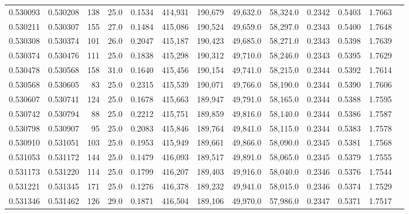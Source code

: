 \begin{tabular}{rrrrrrrrrrrrr}
0.530093 & 0.530208 &   138 & 25.0 &                                     0.1534 & 414,931 & 190,679 &  49,632.0 &  58,324.0 & 0.2342 & 0.5403 & 1.7663 \\
0.530211 & 0.530307 &   155 & 27.0 &                                     0.1484 & 415,086 & 190,524 &  49,659.0 &  58,297.0 & 0.2343 & 0.5400 & 1.7648 \\
0.530308 & 0.530374 &   101 & 26.0 &                                     0.2047 & 415,187 & 190,423 &  49,685.0 &  58,271.0 & 0.2343 & 0.5398 & 1.7639 \\
0.530374 & 0.530476 &   111 & 25.0 &                                     0.1838 & 415,298 & 190,312 &  49,710.0 &  58,246.0 & 0.2343 & 0.5395 & 1.7629 \\
0.530478 & 0.530568 &   158 & 31.0 &                                     0.1640 & 415,456 & 190,154 &  49,741.0 &  58,215.0 & 0.2344 & 0.5392 & 1.7614 \\
0.530568 & 0.530605 &    83 & 25.0 &                                     0.2315 & 415,539 & 190,071 &  49,766.0 &  58,190.0 & 0.2344 & 0.5390 & 1.7606 \\
0.530607 & 0.530741 &   124 & 25.0 &                                     0.1678 & 415,663 & 189,947 &  49,791.0 &  58,165.0 & 0.2344 & 0.5388 & 1.7595 \\
0.530742 & 0.530794 &    88 & 25.0 &                                     0.2212 & 415,751 & 189,859 &  49,816.0 &  58,140.0 & 0.2344 & 0.5386 & 1.7587 \\
0.530798 & 0.530907 &    95 & 25.0 &                                     0.2083 & 415,846 & 189,764 &  49,841.0 &  58,115.0 & 0.2344 & 0.5383 & 1.7578 \\
0.530910 & 0.531051 &   103 & 25.0 &                                     0.1953 & 415,949 & 189,661 &  49,866.0 &  58,090.0 & 0.2345 & 0.5381 & 1.7568 \\
0.531053 & 0.531172 &   144 & 25.0 &                                     0.1479 & 416,093 & 189,517 &  49,891.0 &  58,065.0 & 0.2345 & 0.5379 & 1.7555 \\
0.531173 & 0.531220 &   114 & 25.0 &                                     0.1799 & 416,207 & 189,403 &  49,916.0 &  58,040.0 & 0.2346 & 0.5376 & 1.7544 \\
0.531221 & 0.531345 &   171 & 25.0 &                                     0.1276 & 416,378 & 189,232 &  49,941.0 &  58,015.0 & 0.2346 & 0.5374 & 1.7529 \\
0.531346 & 0.531462 &   126 & 29.0 &                                     0.1871 & 416,504 & 189,106 &  49,970.0 &  57,986.0 & 0.2347 & 0.5371 & 1.7517 \\

\end{tabular}
